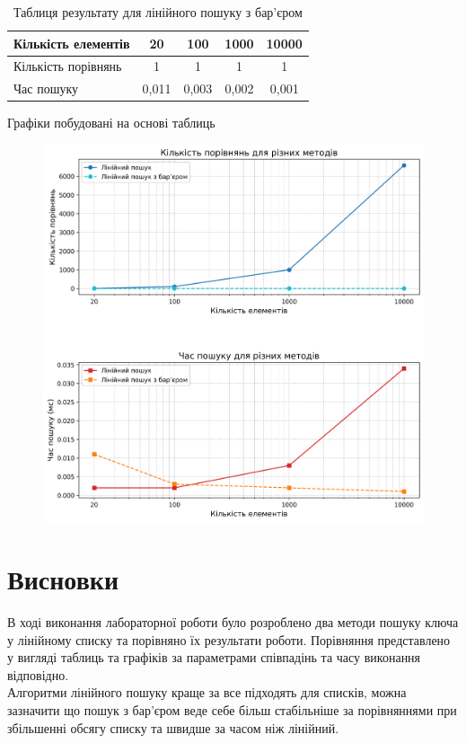 \vspace{-10pt} 


\begin{table}[htbp]
\caption{Таблиця результату для лінійного пошуку з бар’єром}
\begin{tabular}{|l|c|c|c|c|}
\hline
Кількість елементів & 20    & 100   & 1000  & 10000 \\ \hline
Кількість порівнянь & 1     & 1     & 1     & 1     \\ \hline
Час пошуку          & 0,011 & 0,003 & 0,002 & 0,001 \\ \hline
\end{tabular}
\end{table}

Графіки побудовані на основі таблиць
\begin{figure}[h!]
  \centering
  \includegraphics[width=17cm]{reports/algos/lab9/assets/plot.png}
\end{figure}



\clearpage
\section{Висновки}
В ході виконання лабораторної роботи було розроблено два методи пошуку ключа у лінійному списку та порівняно їх результати роботи. Порівняння представлено у вигляді таблиць та графіків за параметрами співпадінь та часу виконання відповідно. \\

Алгоритми лінійного пошуку краще за все підходять для списків, можна зазначити що пошук з бар’єром веде себе більш стабільніше за порівняннями при збільшенні обсягу списку та швидше за часом ніж лінійний.



